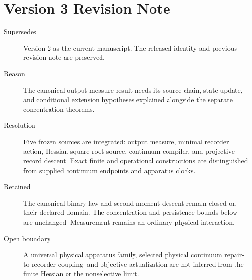 \documentclass[11pt]{article}
\begin{document}
\section*{Version 3 Revision Note}
\begin{description}
\item[Supersedes] Version 2 as the current manuscript. The released identity
and previous revision note are preserved.
\item[Reason] The canonical output-measure result needs its source chain,
state update, and conditional extension hypotheses explained alongside the
separate concentration theorems.
\item[Resolution] Five frozen sources are integrated: output measure,
minimal recorder action, Hessian square-root source, continuum compiler,
and projective record descent. Exact finite and operational constructions
are distinguished from supplied continuum endpoints and apparatus clocks.
\item[Retained] The canonical binary law and second-moment descent remain
closed on their declared domain. The concentration and persistence bounds
below are unchanged. Measurement remains an ordinary physical interaction.
\item[Open boundary] A universal physical apparatus family, selected
physical continuum repair-to-recorder coupling, and objective actualization
are not inferred from the finite Hessian or the nonselective limit.
\end{description}
\end{document}
